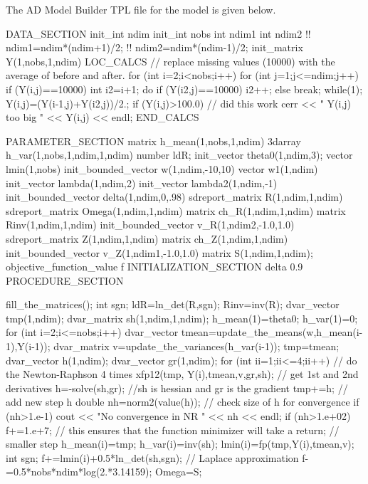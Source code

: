 The AD Model Builder TPL file for the model is given below.

\beginexample
DATA_SECTION
  init_int ndim
  init_int nobs
  int ndim1
  int ndim2
 !! ndim1=ndim*(ndim+1)/2;
 !! ndim2=ndim*(ndim-1)/2;
  init_matrix Y(1,nobs,1,ndim)
 LOC_CALCS
  // replace missing values (10000) with the average of before and after.
  for (int i=2;i<nobs;i++)
    for (int j=1;j<=ndim;j++)
      if (Y(i,j)==10000)
      {
        int i2=i+1;
        do
        {
          if (Y(i2,j)==10000) 
            i2++;
          else
            break; 
        } 
        while(1);
        Y(i,j)=(Y(i-1,j)+Y(i2,j))/2.;
        if (Y(i,j)>100.0)     // did this work
          cerr << " Y(i,j) too big " << Y(i,j) << endl; 
      }      
 END_CALCS
 
PARAMETER_SECTION
  matrix h_mean(1,nobs,1,ndim)
  3darray h_var(1,nobs,1,ndim,1,ndim)
  number ldR;
  init_vector theta0(1,ndim,3);
  vector lmin(1,nobs)
  init_bounded_vector w(1,ndim,-10,10)
  vector w1(1,ndim)
  init_vector lambda(1,ndim,2)
  init_vector lambda2(1,ndim,-1)
  init_bounded_vector delta(1,ndim,0,.98)
  sdreport_matrix R(1,ndim,1,ndim)
  sdreport_matrix Omega(1,ndim,1,ndim)
  matrix ch_R(1,ndim,1,ndim)
  matrix Rinv(1,ndim,1,ndim)
  init_bounded_vector v_R(1,ndim2,-1.0,1.0)
  sdreport_matrix Z(1,ndim,1,ndim)
  matrix ch_Z(1,ndim,1,ndim)
  init_bounded_vector v_Z(1,ndim1,-1.0,1.0)
  matrix S(1,ndim,1,ndim);
  objective_function_value f
INITIALIZATION_SECTION
  delta 0.9
PROCEDURE_SECTION

  fill_the_matrices();
  int sgn;
  ldR=ln_det(R,sgn);
  Rinv=inv(R);
  dvar_vector tmp(1,ndim);
  dvar_matrix sh(1,ndim,1,ndim);
  h_mean(1)=theta0;
  h_var(1)=0; 
  for (int i=2;i<=nobs;i++)
  {
    dvar_vector tmean=update_the_means(w,h_mean(i-1),Y(i-1));
    dvar_matrix v=update_the_variances(h_var(i-1));
    tmp=tmean;
    dvar_vector h(1,ndim);
    dvar_vector gr(1,ndim);
    for (int ii=1;ii<=4;ii++)  // do the Newton-Raphson 4 times
    {
      xfp12(tmp, Y(i),tmean,v,gr,sh); // get 1st and 2nd derivatives
      h=-solve(sh,gr);  //sh is hessian and gr is the gradient
      tmp+=h;  // add new step h
    }
    double nh=norm2(value(h)); // check size of h for convergence
    if (nh>1.e-1) 
      cout << "No convergence in NR " << nh << endl;
    if (nh>1.e+02) 
    {
      f+=1.e+7;   // this ensures that the function minimizer will take a
      return;    // smaller step
    }
    h_mean(i)=tmp;
    h_var(i)=inv(sh);
    lmin(i)=fp(tmp,Y(i),tmean,v);
    int sgn;
    f+=lmin(i)+0.5*ln_det(sh,sgn);  // Laplace approximation
  }
  f-=0.5*nobs*ndim*log(2.*3.14159);
  Omega=S;

